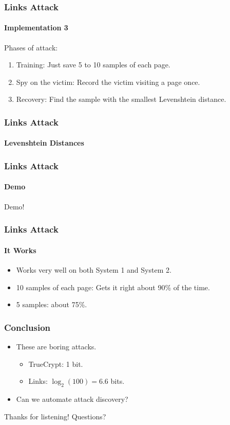 \documentclass{beamer}
\begin{document}
\begin{frame}
    \frametitle{Links Attack}
    \framesubtitle{Implementation 3}

    Phases of attack:

    \begin{enumerate}
        \item Training: Just save 5 to 10 samples of each page.
        \item Spy on the victim: Record the victim visiting a page once.
        \item Recovery: Find the sample with the smallest Levenshtein distance.
    \end{enumerate}
\end{frame}

\begin{frame}
    \frametitle{Links Attack}
    \framesubtitle{Levenshtein Distances}


\end{frame}

\begin{frame}
    \frametitle{Links Attack}
    \framesubtitle{Demo}
    Demo!
\end{frame}

\begin{frame}
    \frametitle{Links Attack}
    \framesubtitle{It Works}


    \begin{itemize}
        \item Works very well on both System 1 and System 2.
        \item 10 samples of each page: Gets it right about 90\% of the time.
        \item 5 samples: about 75\%.
    \end{itemize}


\end{frame}


\begin{frame}
    \frametitle{Conclusion}

    \begin{itemize}
        \item These are boring attacks.
        \begin{itemize}
            \item TrueCrypt: 1 bit.
            \item Links: $\log_2(100) = 6.6$ bits.
        \end{itemize}

        \item Can we automate attack discovery?
    \end{itemize}
\end{frame}

\begin{frame}
    Thanks for listening! Questions?
\end{frame}
\end{document}
